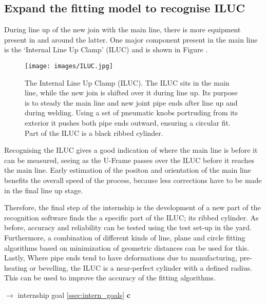 \subsection{Expand the fitting model to recognise ILUC} \label{ssec:expand_model}
During line up of the new join with the main line, there is more equipment present in and around the latter. One major component present
in the main line is the `Internal Line Up Clamp' (ILUC) and is shown in Figure .
\begin{figure}[H]
    \centering
    \texttt{[image: images/ILUC.jpg]}
    \caption{The Internal Line Up Clamp (ILUC). The ILUC sits in the main line, while the new join is shifted over it during line up.
        Its purpose is to steady the main line and new joint pipe ends after line up and during welding. Using a set of pneumatic knobs
        portruding from its exterior it pushes both pipe ends outward, ensuring a circular fit.
        Part of the ILUC is a black ribbed cylinder.}
    \label{fig:iluc}
\end{figure}

Recognising the ILUC gives a good indication of where the main line
is before it can be measured, seeing as the U-Frame passes over the ILUC before it reaches the main line.
Early estimation of the positon and orientation of the main line benefits the overall speed of the process,
because less corrections have to be made in the final line up stage.

Therefore, the final step of the internship is the development of a new part of the recognition software finds the a specific part of
the ILUC; its ribbed cylinder. As before, accuracy and reliability can be tested using the test set-up in the yard. Furthermore,
a combination of different kinds of line, plane and circle fitting algorithms based on minimization of geometric distances can
be used for this. Lastly, Where pipe ends tend to have deformations due to manufacturing, pre-heating or bevelling,
the ILUC is a near-perfect cylinder with a defined radius. This can be used to improve the accuracy of the fitting algorithms.
\begin{flushright}
    $\rightarrow$ internship goal \ref{ssec:intern_goals} \textbf{c}
\end{flushright}